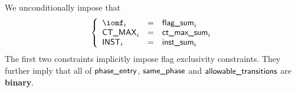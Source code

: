 We unconditionally impose that
\[
	\left\{ \begin{array}{lcl}
		\iomf        _{i} & = & \locFlagSum  _{i}                         \\
		\maxCt       _{i} & = & \locMaxCtSum _{i}                         \\
		\instruction _{i} & = & \locInstSum  _{i}                         \\
	\end{array} \right.
\]
\saNote{}
The first two constraints implicitly impose flag exclusivity constraints.
They further imply that all of
$\textsf{phase\_entry}$,
$\textsf{same\_phase}$ and
$\textsf{allowable\_transitions}$
are \textbf{binary}.

